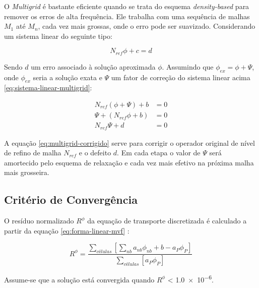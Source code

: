 O \textit{Multigrid} é bastante eficiente quando se trata do esquema \textit{density-based} para remover os erros de alta frequência. Ele trabalha com uma sequência de malhas \(M_1\) até \(M_n\), cada vez mais grossas, onde o erro pode ser suavizado. Considerando um sistema linear do seguinte tipo:

\begin{equation}
    \label{eq:sistema-linear-multigrid}
    N_{ref}\phi + c = d
\end{equation}

Sendo \(d\) um erro associado à solução aproximada \(\phi\). Assumindo que \(\phi_{ex} = \phi + \Psi\), onde \(\phi_{ex}\) seria a solução exata e \(\Psi\) um fator de correção do sistema linear acima \ref{eq:sistema-linear-multigrid}:

\begin{subequations}\label{eq:multigrid-corrigido} 
\begin{align}
    N_{ref}(\phi + \Psi) + b &= 0 \\
    \Psi + (N_{ref}\phi + b) &= 0 \\
    N_{ref}\Psi + d &= 0
\end{align}
\end{subequations}

A equação \ref{eq:multigrid-corrigido} serve para corrigir o operador original de nível de refino de malha \(N_{ref}\) e o defeito \(d\). Em cada etapa o valor de \(\Psi\) será amortecido pelo esquema de relaxação e cada vez mais efetivo na próxima malha mais grosseira.

\subsection{Critério de Convergência}

O resíduo normalizado \(R^{\phi}\) da equação de transporte discretizada é calculado a partir da equação \ref{eq:forma-linear-mvf} \cite{Rezende2009}:

\begin{equation}
\label{eq:criterio-convergencia}
	R^{\phi} = \frac{\sum_{células} \left[ \sum_{nb}a_{nb}\phi_{nb}+b-a_{P}\phi_{P}\right]}{\sum_{células}\left[a_{P}\phi_{P}\right]}    
\end{equation}

Assume-se que a solução está convergida quando \(R^{\phi}\) < \num{1,0e-6}.